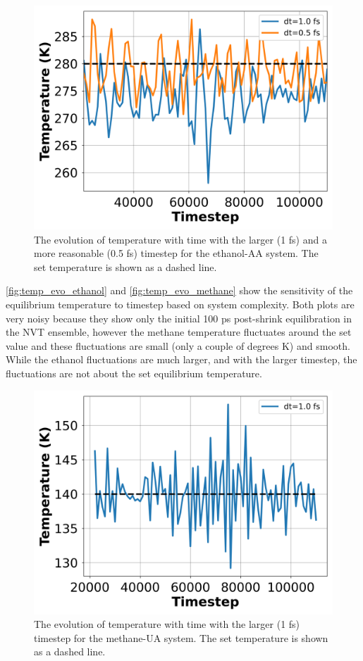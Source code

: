 \begin{figure}[h!]
    \centering
    \includegraphics[width=0.8\linewidth,keepaspectratio]{figures/rep_study/temp_evolution.png}
    \caption{The evolution of temperature with time with the larger (1 fs) and a more reasonable (0.5 fs) timestep for the ethanol-AA system. The set temperature is shown as a dashed line. }\label{fig:temp_evo_ethanol}
\end{figure}
\autoref{fig:temp_evo_ethanol} and \autoref{fig:temp_evo_methane} show the sensitivity of the equilibrium temperature to timestep based on system complexity. Both plots are very noisy because they show only the initial 100 ps post-shrink equilibration in the NVT ensemble, however the methane temperature fluctuates around the set value and these fluctuations are small (only a couple of degrees K) and smooth. While the ethanol fluctuations are much larger, and with the larger timestep, the fluctuations are not about the set equilibrium temperature.
\begin{figure}[h!]
    \centering
    \includegraphics[width=0.8\linewidth,keepaspectratio]{figures/rep_study/temp_evolution_methane.png}
    \caption{The evolution of temperature with time with the larger (1 fs) timestep for the methane-UA system. The set temperature is shown as a dashed line.}\label{fig:temp_evo_methane}
\end{figure}


